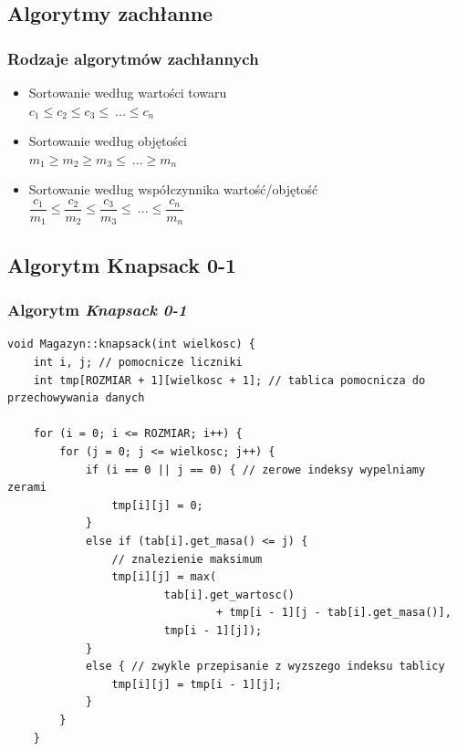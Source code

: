 \documentclass{beamer}
\begin{document}
\subsection{Algorytmy zachłanne}
\begin{frame}
	\frametitle{Rodzaje algorytmów zachłannych}
	\begin{itemize}
	\item Sortowanie według wartości towaru\\
		$c_{1} \leq c_{2} \leq c_{3} \leq \ ... \leq c_{n}$
	\item Sortowanie według objętości\\
		$m_{1} \geq m_{2} \geq m_{3} \leq \ ... \geq m_{n}$
	\item Sortowanie według współczynnika wartość/objętość\\
		$\dfrac{c_{1}}{m_{1}} \leq \dfrac{c_{2}}{m_{2}} \leq \dfrac{c_{3}}{m_{3}} \leq \ ... \leq \dfrac{c_{n}}{m_{n}}$
	\end{itemize}
\end{frame}

\subsection{Algorytm Knapsack 0-1}
\begin{frame}[fragile]
	\frametitle{Algorytm \textit{Knapsack 0-1}}
	\begin{lstlisting}[basicstyle=\tiny,tabsize=2]
void Magazyn::knapsack(int wielkosc) {
	int i, j; // pomocnicze liczniki
	int tmp[ROZMIAR + 1][wielkosc + 1]; // tablica pomocnicza do przechowywania danych

	for (i = 0; i <= ROZMIAR; i++) {
		for (j = 0; j <= wielkosc; j++) {
			if (i == 0 || j == 0) { // zerowe indeksy wypelniamy zerami
				tmp[i][j] = 0;
			}
			else if (tab[i].get_masa() <= j) {
				// znalezienie maksimum
				tmp[i][j] = max(
						tab[i].get_wartosc()
								+ tmp[i - 1][j - tab[i].get_masa()],
						tmp[i - 1][j]);
			}
			else { // zwykle przepisanie z wyzszego indeksu tablicy
				tmp[i][j] = tmp[i - 1][j];
			}
		}
	}
	\end{lstlisting}
\end{frame}
\end{document}
